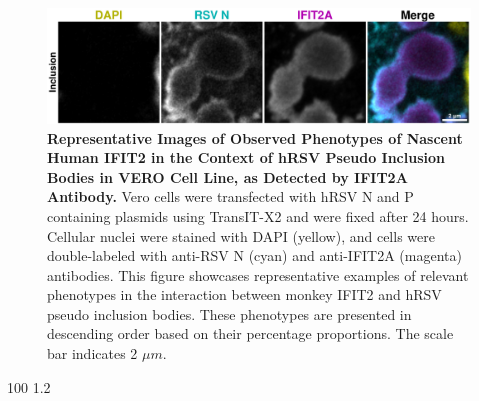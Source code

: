 \begin{figure}
    \centering
    \includegraphics[width=1\linewidth]{09. Chapter 4/Figs/02. pIB/02. IFIT2A/06. i2a-vero-hnhp.pdf}  
    \caption[Representative Images of Observed Phenotypes of Nascent Human IFIT2 in the Context of hRSV Pseudo Inclusion Bodies in VERO Cell Line, as Detected by IFIT2A Antibody.]{\textbf{Representative Images of Observed Phenotypes of Nascent Human IFIT2 in the Context of hRSV Pseudo Inclusion Bodies in VERO Cell Line, as Detected by IFIT2A Antibody.} Vero cells were transfected with hRSV N and P containing plasmids using TransIT-X2 and were fixed after 24 hours. Cellular nuclei were stained with DAPI (yellow), and cells were double-labeled with anti-RSV N (cyan) and anti-IFIT2A (magenta) antibodies. This figure showcases representative examples of relevant phenotypes in the interaction between monkey IFIT2 and hRSV pseudo inclusion bodies. These phenotypes are presented in descending order based on their percentage proportions. The scale bar indicates 2 \(\mu m\).}
    \label{fig:Representative Images of Observed Phenotypes of Nascent Human IFIT2 in the Context of hRSV Pseudo Inclusion Bodies in VERO Cell Line, as Detected by IFIT2A Antibody}
\end{figure}

100
1.2

